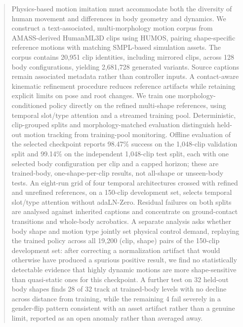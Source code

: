 \begin{abstract}
Physics-based motion imitation must accommodate both the diversity of human
movement and differences in body geometry and dynamics. We construct a
text-associated, multi-morphology motion corpus from AMASS-derived HumanML3D
clips using HUMOS, pairing shape-specific reference motions with matching
SMPL-based simulation assets. The corpus contains 20,951 clip identities,
including mirrored clips, across 128 body configurations, yielding 2,681,728
generated variants. Source captions remain associated metadata rather than
controller inputs. A contact-aware kinematic refinement procedure reduces
reference artifacts while retaining explicit limits on pose and root
changes. We train one morphology-conditioned policy directly on the refined
multi-shape references, using temporal slot/type attention and a streamed
training pool. Deterministic, clip-grouped splits and morphology-matched
evaluation distinguish held-out motion tracking from training-pool monitoring.
Offline evaluation of the selected checkpoint reports 98.47\% success on the
1,048-clip validation split and 99.14\% on the independent 1,048-clip test
split, each with one selected body configuration per clip and a capped
horizon; these are trained-body, one-shape-per-clip results, not all-shape or
unseen-body tests. An eight-run grid of four temporal architectures crossed
with refined and unrefined references, on a 150-clip development set,
selects temporal slot/type attention without adaLN-Zero. Residual failures on
both splits are analysed against inherited captions and concentrate on
ground-contact transitions and whole-body acrobatics. A separate analysis
asks whether body shape and motion type jointly set physical control demand,
replaying the trained policy across all 19,200 (clip, shape) pairs of the
150-clip development set: after correcting a normalization artifact that
would otherwise have produced a spurious positive result, we find no
statistically detectable evidence that highly dynamic motions are more
shape-sensitive than quasi-static ones for this checkpoint. A further test on 32 held-out body shapes finds 28 of 32 track at
trained-body levels with no decline across distance from training, while the
remaining 4 fail severely in a gender-flip pattern consistent with an asset
artifact rather than a genuine limit, reported as an open anomaly rather than
averaged away.
\end{abstract}
